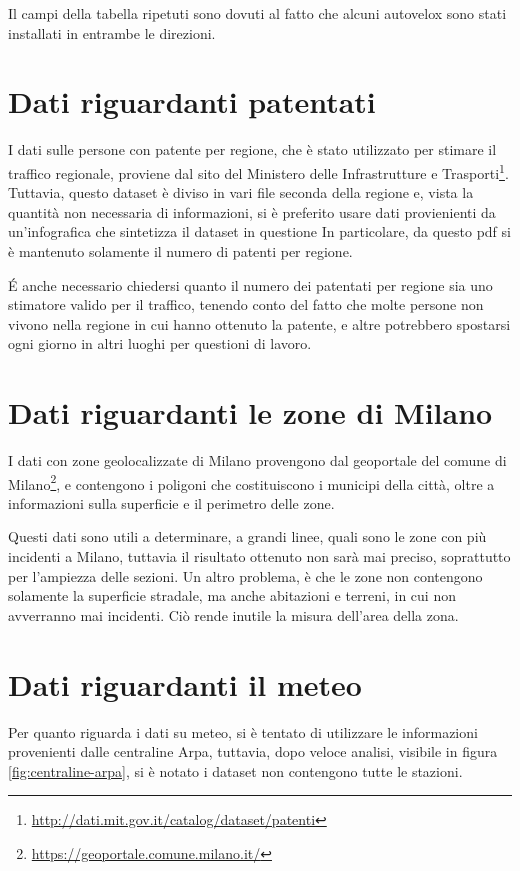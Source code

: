 \documentclass[a4paper]{report}
\begin{document}
Il campi della tabella ripetuti sono dovuti al fatto che alcuni autovelox sono stati 
installati in entrambe le direzioni.

\section{Dati riguardanti patentati}

I dati sulle persone con patente per regione, che è stato utilizzato per stimare il traffico 
regionale, proviene dal sito del Ministero delle Infrastrutture e 
Trasporti\footnote{\url{http://dati.mit.gov.it/catalog/dataset/patenti}}.
Tuttavia, questo dataset è diviso in vari file seconda della regione e, vista la quantità 
non necessaria di informazioni, si è preferito usare dati provienienti da un'infografica che 
sintetizza il dataset in questione \cite{INFOGRAFICA_MIT:1}
In particolare, da questo pdf si è mantenuto solamente il numero di patenti per regione.

\'E anche necessario chiedersi quanto il numero dei patentati per regione sia uno stimatore 
valido per il traffico, tenendo conto del fatto che molte persone non vivono nella regione 
in cui hanno ottenuto la patente, e altre potrebbero spostarsi ogni giorno in altri 
luoghi per questioni di lavoro.

\section{Dati riguardanti le zone di Milano}

I dati con zone geolocalizzate di Milano provengono dal geoportale del comune di 
Milano\footnote{\url{https://geoportale.comune.milano.it/}}, e contengono i poligoni che 
costituiscono i municipi della città, 
oltre a informazioni sulla superficie e il perimetro delle zone.

Questi dati sono utili a determinare, a grandi linee, quali sono le zone con più incidenti 
a Milano, tuttavia il risultato ottenuto non sarà mai preciso, 
soprattutto per l'ampiezza delle sezioni.
Un altro problema, è che le zone non contengono solamente la superficie stradale, ma anche 
abitazioni e terreni, in cui non avverranno mai incidenti. 
Ciò rende inutile la misura dell'area della zona.

\section{Dati riguardanti il meteo}

Per quanto riguarda i dati su meteo, si è tentato di utilizzare le informazioni 
provenienti dalle centraline Arpa, tuttavia, dopo veloce analisi, visibile 
in figura \ref{fig:centraline-arpa}, si è notato i dataset non 
contengono tutte le stazioni.
\end{document}

